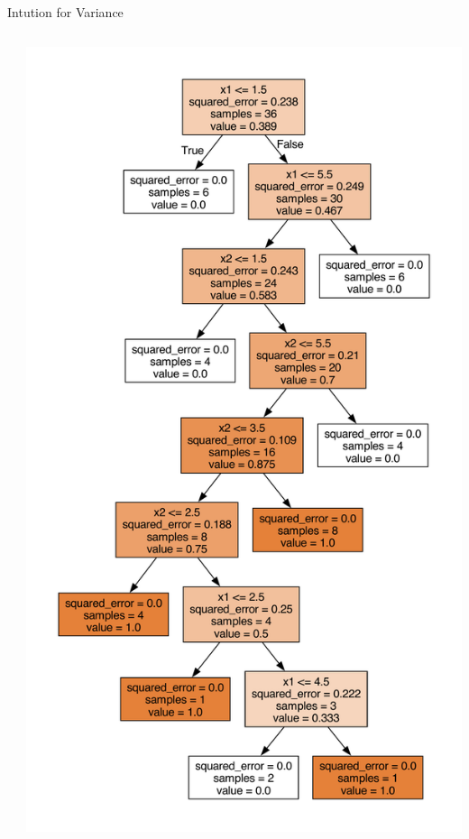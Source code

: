 \documentclass{beamer}
\begin{document}
\begin{frame}{Intution for Variance}
\begin{columns}
\begin{column}{0.5\textwidth}
\begin{center}
\end{center}
\end{column}
\begin{column}{0.5\textwidth}
\begin{center}
\includegraphics[scale=0.2]{../figures/decision-trees/bias-variance-full-depth-sklearn-2.pdf}
\end{center}
\end{column}
\end{columns}
\end{frame}
\end{document}
